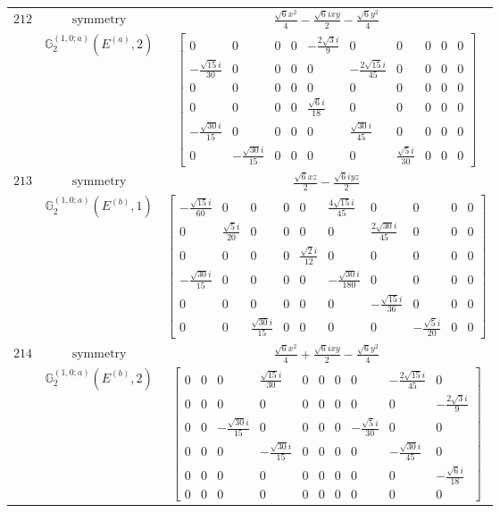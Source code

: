 \documentclass[fleqn,8pt,landscape]{jsarticle}
\begin{document}
\begin{longtable}{ccc}
$ 212 $ & $ \text{symmetry} $ & $ \frac{\sqrt{6} x^{2}}{4} - \frac{\sqrt{6} i x y}{2} - \frac{\sqrt{6} y^{2}}{4} $ \\
$  $ & $ \mathbb{G}_{2}^{(1,0;a)}(E^{(a)},2) $ & $ \begin{bmatrix} 0 & 0 & 0 & 0 & - \frac{2 \sqrt{3} i}{9} & 0 & 0 & 0 & 0 & 0 \\ - \frac{\sqrt{15} i}{30} & 0 & 0 & 0 & 0 & - \frac{2 \sqrt{15} i}{45} & 0 & 0 & 0 & 0 \\ 0 & 0 & 0 & 0 & 0 & 0 & 0 & 0 & 0 & 0 \\ 0 & 0 & 0 & 0 & \frac{\sqrt{6} i}{18} & 0 & 0 & 0 & 0 & 0 \\ - \frac{\sqrt{30} i}{15} & 0 & 0 & 0 & 0 & \frac{\sqrt{30} i}{45} & 0 & 0 & 0 & 0 \\ 0 & - \frac{\sqrt{30} i}{15} & 0 & 0 & 0 & 0 & \frac{\sqrt{5} i}{30} & 0 & 0 & 0 \end{bmatrix} $ \\ \hline
$ 213 $ & $ \text{symmetry} $ & $ \frac{\sqrt{6} x z}{2} - \frac{\sqrt{6} i y z}{2} $ \\
$  $ & $ \mathbb{G}_{2}^{(1,0;a)}(E^{(b)},1) $ & $ \begin{bmatrix} - \frac{\sqrt{15} i}{60} & 0 & 0 & 0 & 0 & \frac{4 \sqrt{15} i}{45} & 0 & 0 & 0 & 0 \\ 0 & \frac{\sqrt{5} i}{20} & 0 & 0 & 0 & 0 & \frac{2 \sqrt{30} i}{45} & 0 & 0 & 0 \\ 0 & 0 & 0 & 0 & \frac{\sqrt{2} i}{12} & 0 & 0 & 0 & 0 & 0 \\ - \frac{\sqrt{30} i}{15} & 0 & 0 & 0 & 0 & - \frac{\sqrt{30} i}{180} & 0 & 0 & 0 & 0 \\ 0 & 0 & 0 & 0 & 0 & 0 & - \frac{\sqrt{15} i}{36} & 0 & 0 & 0 \\ 0 & 0 & \frac{\sqrt{30} i}{15} & 0 & 0 & 0 & 0 & - \frac{\sqrt{5} i}{20} & 0 & 0 \end{bmatrix} $ \\ \hline
$ 214 $ & $ \text{symmetry} $ & $ \frac{\sqrt{6} x^{2}}{4} + \frac{\sqrt{6} i x y}{2} - \frac{\sqrt{6} y^{2}}{4} $ \\
$  $ & $ \mathbb{G}_{2}^{(1,0;a)}(E^{(b)},2) $ & $ \begin{bmatrix} 0 & 0 & 0 & \frac{\sqrt{15} i}{30} & 0 & 0 & 0 & 0 & - \frac{2 \sqrt{15} i}{45} & 0 \\ 0 & 0 & 0 & 0 & 0 & 0 & 0 & 0 & 0 & - \frac{2 \sqrt{3} i}{9} \\ 0 & 0 & - \frac{\sqrt{30} i}{15} & 0 & 0 & 0 & 0 & - \frac{\sqrt{5} i}{30} & 0 & 0 \\ 0 & 0 & 0 & - \frac{\sqrt{30} i}{15} & 0 & 0 & 0 & 0 & - \frac{\sqrt{30} i}{45} & 0 \\ 0 & 0 & 0 & 0 & 0 & 0 & 0 & 0 & 0 & - \frac{\sqrt{6} i}{18} \\ 0 & 0 & 0 & 0 & 0 & 0 & 0 & 0 & 0 & 0 \end{bmatrix} $ \\ \hline

\end{longtable}
\end{document}
